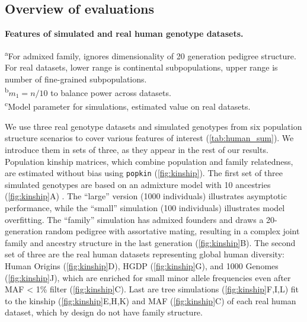 \documentclass[11pt]{article}
\begin{document}
\subsection{Overview of evaluations}

\begin{table}[hb!]
  \centering
  \footnotesize
  \caption{
    \textbf{Features of simulated and real human genotype datasets.}
  }
  \label{tab:human_sum}
  \begin{flushleft} 
    \textsuperscript{a}For admixed family, ignores dimensionality of 20 generation pedigree structure.
    For real datasets, lower range is continental subpopulations, upper range is number of fine-grained subpopulations.\\
    \textsuperscript{b}$m_1 = n / 10$ to balance power across datasets.\\
    \textsuperscript{c}Model parameter for simulations, estimated value on real datasets.
  \end{flushleft}
\end{table}

We use three real genotype datasets and simulated genotypes from six population structure scenarios to cover various features of interest (\cref{tab:human_sum}).
We introduce them in sets of three, as they appear in the rest of our results.
Population kinship matrices, which combine population and family relatedness, are estimated without bias using \texttt{popkin} \citep{ochoa_estimating_2021} (\cref{fig:kinship}).
The first set of three simulated genotypes are based on an admixture model with 10 ancestries (\cref{fig:kinship}A) \citep{ochoa_estimating_2021, gopalan_scaling_2016, cabreros_likelihood-free_2019}.
The ``large'' version (1000 individuals) illustrates asymptotic performance, while the ``small'' simulation (100 individuals) illustrates model overfitting.
The ``family'' simulation has admixed founders and draws a 20-generation random pedigree with assortative mating, resulting in a complex joint family and ancestry structure in the last generation (\cref{fig:kinship}B).
The second set of three are the real human datasets representing global human diversity: Human Origins (\cref{fig:kinship}D), HGDP (\cref{fig:kinship}G), and 1000 Genomes (\cref{fig:kinship}J), which are enriched for small minor allele frequencies even after MAF < 1\% filter (\cref{fig:kinship}C).
Last are tree simulations (\cref{fig:kinship}F,I,L) fit to the kinship (\cref{fig:kinship}E,H,K) and MAF (\cref{fig:kinship}C) of each real human dataset, which by design do not have family structure.
\end{document}
